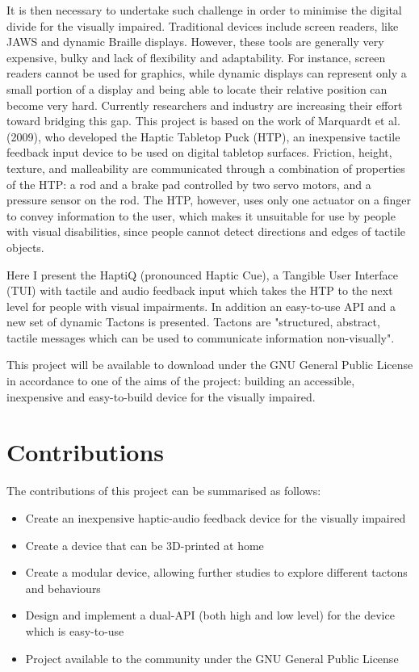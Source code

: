 It is then necessary to undertake such challenge in order to minimise the digital divide for the visually impaired. Traditional devices include screen readers, like JAWS\cite{JAWS} and dynamic Braille displays\cite{HumanWare, shimada2010development, blindMaps}. However, these tools are generally very expensive, bulky and lack of flexibility and adaptability. For instance, screen readers cannot be used for graphics, while dynamic displays can represent only a small portion of a display and being able to locate their relative position can become very hard.
Currently researchers and industry are increasing their effort toward bridging this gap. This project is based on the work of Marquardt et al.(2009)\nocite{marquardt2009haptic}, who developed the Haptic Tabletop Puck (HTP), an inexpensive tactile feedback input device to be used on digital tabletop surfaces. Friction, height, texture, and malleability are communicated through a combination of properties of the HTP: a rod and a brake pad controlled by two servo motors, and a pressure sensor on the rod. The HTP, however, uses only one actuator on a finger to convey information to the user, which makes it unsuitable for use by people with visual disabilities, since people cannot detect directions and edges of tactile objects. \par

Here I present the HaptiQ (pronounced Haptic Cue), a Tangible User Interface (TUI)\cite{ishii1997tangible} with tactile and audio feedback input which takes the HTP to the next level for people with visual impairments. In addition an easy-to-use API and a new set of dynamic Tactons is presented. Tactons are "structured, abstract, tactile messages which can be used to communicate information non-visually"\cite{brown2005first}.\par
This project will be available to download under the GNU General Public License in accordance to one of the aims of the project: building an accessible, inexpensive and easy-to-build device for the visually impaired. \par

\section{Contributions}

The contributions of this project can be summarised as follows:
\begin{itemize}
	\item Create an inexpensive haptic-audio feedback device for the visually impaired
    \item Create a device that can be 3D-printed at home
    \item Create a modular device, allowing further studies to explore different tactons and behaviours
    \item Design and implement a dual-API (both high and low level) for the device which is easy-to-use
    \item Project available to the community under the GNU General Public License 
\end{itemize}

